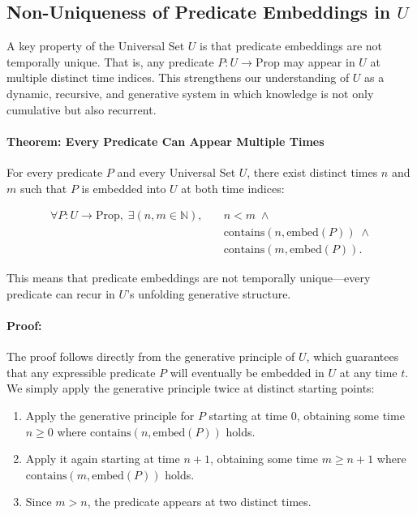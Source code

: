 \documentclass[12pt]{article}
\begin{document}
\subsection{Non-Uniqueness of Predicate Embeddings in \( U \)}

A key property of the Universal Set \( U \) is that predicate embeddings are not temporally unique. That is, any predicate \( P: U \to \text{Prop} \) may appear in \( U \) at multiple distinct time indices. This strengthens our understanding of \( U \) as a dynamic, recursive, and generative system in which knowledge is not only cumulative but also recurrent.

\paragraph{Theorem: Every Predicate Can Appear Multiple Times}
For every predicate \( P \) and every Universal Set \( U \), there exist distinct times \( n \) and \( m \) such that \( P \) is embedded into \( U \) at both time indices:

\begin{align}
    \forall P: U \to \text{Prop},\; \exists (n, m \in \mathbb{N}),\quad 
    & n < m \;\wedge \nonumber \\
    & \text{contains}(n, \text{embed}(P)) \;\wedge \nonumber \\
    & \text{contains}(m, \text{embed}(P)).
\end{align}

This means that predicate embeddings are not temporally unique—every predicate can recur in \( U \)'s unfolding generative structure.

\paragraph{Proof:}
The proof follows directly from the generative principle of \( U \), which guarantees that any expressible predicate \( P \) will eventually be embedded in \( U \) at any time \( t \). We simply apply the generative principle twice at distinct starting points:

\begin{enumerate}
    \item Apply the generative principle for \( P \) starting at time \( 0 \), obtaining some time \( n \geq 0 \) where \( \text{contains}(n, \text{embed}(P)) \) holds.
    \item Apply it again starting at time \( n + 1 \), obtaining some time \( m \geq n + 1 \) where \\
    \( \text{contains}(m, \text{embed}(P)) \) holds.
    \item Since \( m > n \), the predicate appears at two distinct times.
\end{enumerate}
\end{document}
